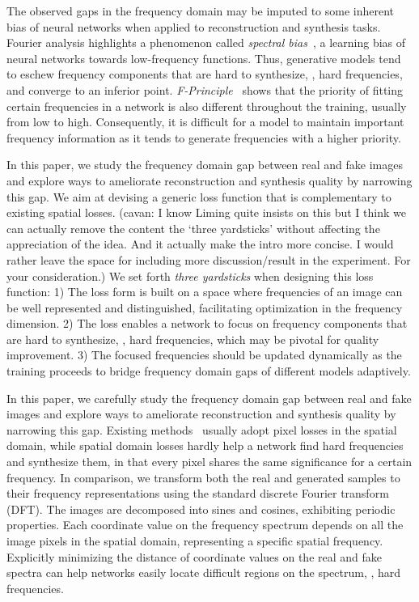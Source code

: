 \documentclass[10pt,twocolumn,letterpaper]{article}
\newcommand{\cavan}[1]{{\color{red}(cavan: {#1})}} \newcommand{\liming}[1]{{\color{blue}{#1}}} \newcommand{\daibo}[1]{{\color{Orange}(daibo: {#1})}} \newcommand{\wayne}[1]{{\color{OliveGreen}(wayne: {#1})}} \newcommand{\misscite}{\textcolor{red}{[C]~}}
\begin{document}
The observed gaps in the frequency domain may be imputed to some inherent bias of neural networks when applied to reconstruction and synthesis tasks.
Fourier analysis highlights a phenomenon called \textit{spectral bias}~\cite{spectralbias,nerf,fourierfeatures}, a learning bias of neural networks towards low-frequency functions. Thus, generative models tend to eschew frequency components that are hard to synthesize, \ie, hard frequencies, and converge to an inferior point.
\textit{F-Principle}~\cite{fprinciple} shows that the priority of fitting certain frequencies in a network is also different throughout the training, usually from low to high.
Consequently, it is difficult for a model to maintain important frequency information as it tends to generate frequencies with a higher priority.


In this paper, we study the frequency domain gap between real and fake images and explore ways to ameliorate reconstruction and synthesis quality by narrowing this gap.
We aim at devising a generic loss function that is complementary to existing spatial losses.
\cavan{I know Liming quite insists on this but I think we can actually remove the content the `three yardsticks' without affecting the appreciation of the idea. And it actually make the intro more concise. I would rather leave the space for including more discussion/result in the experiment. For your consideration.}
We set forth \textit{three yardsticks} when designing this loss function:
1) The loss form is built on a space where frequencies of an image can be well represented and distinguished, facilitating optimization in the frequency dimension.
2) The loss enables a network to focus on frequency components that are hard to synthesize, \ie, hard frequencies, which may be pivotal for quality improvement.
3) The focused frequencies should be updated dynamically as the training proceeds to bridge frequency domain gaps of different models adaptively.
\fi



In this paper, we carefully study the frequency domain gap between real and fake images and explore ways to ameliorate reconstruction and synthesis quality by narrowing this gap.
Existing methods~\cite{vae,pix2pix,SPADE} usually adopt pixel losses in the spatial domain,
while spatial domain losses hardly help a network find hard frequencies and synthesize them, in that every pixel shares the same significance for a certain frequency.
In comparison, we transform both the real and generated samples to their frequency representations using the standard discrete Fourier transform (DFT). The images are decomposed into sines and cosines, exhibiting periodic properties. Each coordinate value on the frequency spectrum depends on all the image pixels in the spatial domain, representing a specific spatial frequency.
Explicitly minimizing the distance of coordinate values on the real and fake spectra can help networks easily locate difficult regions on the spectrum, \ie, hard frequencies.
\end{document}
